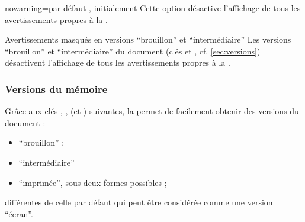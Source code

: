 \begin{docKey}{nowarning}{=\textbar{}}{par défaut ,
    initialement }
  Cette option désactive l'affichage de tous les avertissements propres à la
  \yatcl{}.
\end{docKey}

\begin{dbremark}{Avertissements masqués en versions \enquote{brouillon} et
    \enquote{intermédiaire}}{}
  Les versions \enquote{brouillon} et \enquote{intermédiaire} du document (clés
   et , cf. \vref{sec:versions}) désactivent
  l'affichage de tous les avertissements propres à la \yatcl{}.
\end{dbremark}

\subsubsection{Versions du mémoire}\label{sec:versions}

Grâce aux clés , ,  (et
) suivantes, la \yatcl{} permet de facilement obtenir des
versions du document :
\begin{itemize}
\item \enquote{brouillon} ;
\item \enquote{intermédiaire}
\item \enquote{imprimée}, sous deux formes possibles ;
\end{itemize}
différentes de celle par défaut qui peut être considérée comme une version
\enquote{écran}.

